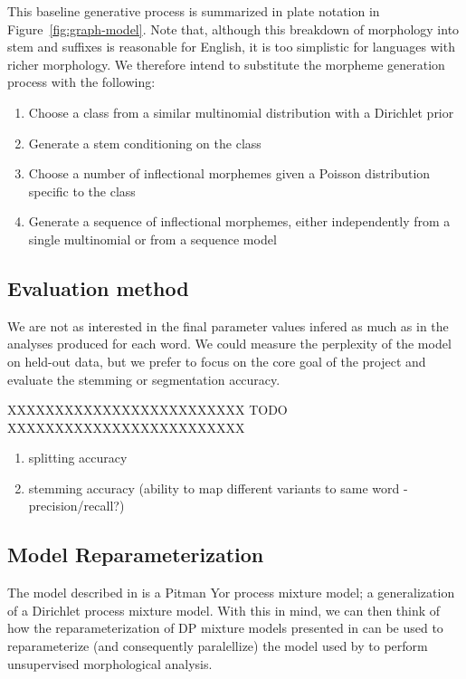 \documentclass{article}
\begin{document}
This baseline generative process is summarized in plate notation in
Figure~\ref{fig:graph-model}. Note that, although this breakdown of
morphology into stem and suffixes is reasonable for English, it is too
simplistic for languages with richer morphology. We therefore intend
to substitute the morpheme generation process with the following:
\begin{enumerate}
    \item Choose a class from a similar multinomial distribution with a Dirichlet prior
    \item Generate a stem conditioning on the class
    \item Choose a number of inflectional morphemes given a Poisson distribution specific to the class
    \item Generate a sequence of inflectional morphemes, either independently from a single multinomial or from a sequence model
\end{enumerate}

\subsection{Evaluation method}

We are not as interested in the final parameter values infered as much
as in the analyses produced for each word. We could measure the
perplexity of the model on held-out data, but we prefer to focus on
the core goal of the project and evaluate the stemming or segmentation
accuracy.

XXXXXXXXXXXXXXXXXXXXXXXXX TODO XXXXXXXXXXXXXXXXXXXXXXXXX
\begin{enumerate}
    \item splitting accuracy
    \item stemming accuracy (ability to map different variants to same word - precision/recall?)
\end{enumerate}

\subsection{Model Reparameterization}

The model described in \cite{goldwater2011} is a Pitman Yor process
mixture model; a generalization of a Dirichlet process mixture
model. With this in mind, we can then think of how the
reparameterization of DP mixture models presented in \cite{lovell2012} can be
used to reparameterize (and consequently paralellize) the model used
by \cite{goldwater2011} to perform unsupervised morphological
analysis.
\end{document}
